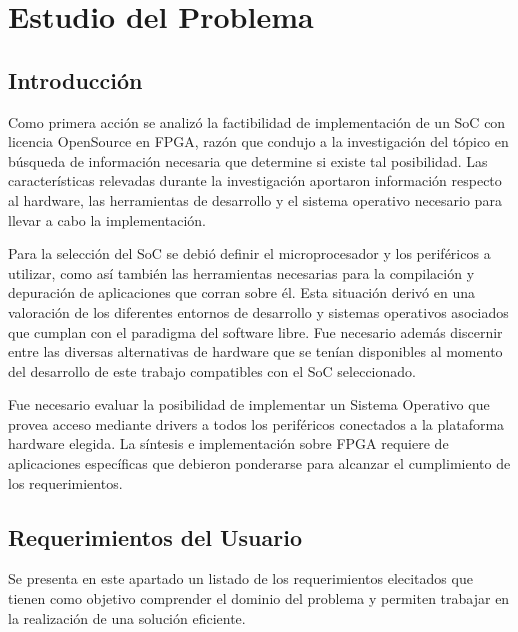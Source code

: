 \chapter{Estudio del Problema}
	
	\section{Introducción}
	\par
	Como primera acción se analizó la factibilidad de implementación de un SoC con licencia OpenSource en FPGA, razón que condujo a la investigación del
	tópico en búsqueda de información necesaria que determine si existe tal posibilidad. Las características relevadas durante la investigación
	aportaron información respecto al hardware, las herramientas de desarrollo y el sistema operativo necesario para llevar a cabo la implementación. 
	\vspace{0.5cm}
	\par
	Para la selección del SoC se debió definir el microprocesador y los periféricos a utilizar, como así también las herramientas necesarias para la
	compilación y depuración de aplicaciones que corran sobre él. Esta situación derivó en una valoración de los diferentes entornos de desarrollo y
	sistemas operativos asociados que cumplan con el paradigma del software libre. Fue necesario además discernir entre las diversas alternativas de
	hardware que se tenían disponibles al momento del desarrollo de este trabajo compatibles con el SoC seleccionado. 
	\vspace{0.5cm}
	\par
	Fue necesario evaluar la posibilidad de implementar un Sistema Operativo que provea acceso mediante drivers a todos los periféricos conectados a
	la plataforma hardware elegida. La síntesis e implementación sobre FPGA requiere de aplicaciones específicas que debieron ponderarse para alcanzar el
	cumplimiento de los requerimientos.
	
	\newpage 
	
	\section{Requerimientos del Usuario}
	\par
	Se presenta en este apartado un listado de los requerimientos elecitados que tienen como objetivo comprender el dominio del problema y permiten
	trabajar en la realización de una solución eficiente.
	
